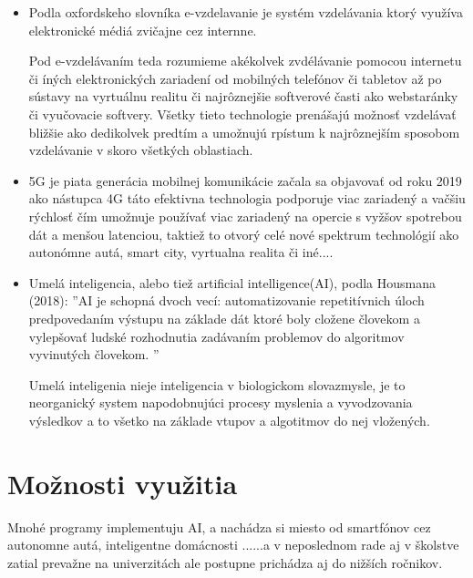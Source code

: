 \documentclass[10pt,oneside,slovak,a4paper]{article}
\begin{document}
\begin{itemize}
\item Podla oxfordskeho slovníka e-vzdelavanie je systém vzdelávania ktorý využíva elektronické médiá zvičajne cez internne. 

Pod e-vzdelávaním teda rozumieme akékolvek zvdélávanie pomocou internetu či íných elektronických zariadení od mobilných telefónov či tabletov až po sústavy na vyrtuálnu realitu či najrôznejšie softverové časti ako webstaránky či vyučovacie softvery. Všetky tieto technologie prenášajú možnosť vzdelávať bližšie ako dedikolvek predtím a umožnujú rpístum k najrôznejším sposobom vzdelávanie v skoro všetkých oblastiach.

\item 
5G je piata generácia mobilnej komunikácie začala sa objavovať od roku 2019 ako nástupca 4G táto efektivna technologia podporuje viac zariadený a vačšiu rýchlosť čím umožnuje používať viac zariadený na opercie s vyžšov spotrebou dát a menšou latenciou, taktiež to otvorý celé nové spektrum technológií ako autonómne autá, smart city, vyrtualna realita či iné....

\item 
Umelá inteligencia, alebo tiež artificial intelligence(AI), podla Housmana (2018): ''AI je schopná dvoch vecí: automatizovanie repetitívnich úloch predpovedaním výstupu na základe dát ktoré boly cložene človekom a vylepšovať ludské rozhodnutia zadávaním problemov do algoritmov vyvinutých človekom. ''

Umelá inteligenia nieje inteligencia v biologickom slovazmysle, je to neorganický system napodobnujúci procesy myslenia a vyvodzovania výsledkov a to všetko na základe vtupov a algotitmov do nej vložených.  



\end{itemize}

\section{Možnosti využitia} 
Mnohé programy implementuju AI, a nachádza si miesto od smartfónov cez autonomne autá, inteligentne domácnosti ......a v neposlednom rade aj v školstve zatial prevažne na univerzitách ale postupne prichádza aj do nižších ročnikov.
\end{document}
